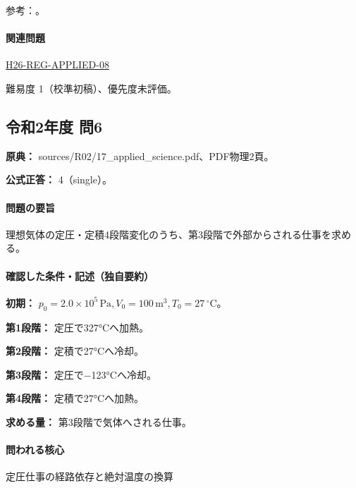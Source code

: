 \par 参考：\cite{mit_thermo_firstlaw2008}。

\paragraph{関連問題} \hyperref[q:h26-reg-applied-08]{H26-REG-APPLIED-08}

\par 難易度 1（校準初稿）、優先度未評価。

\subsection{令和2年度 問6}
\label{q:r02-reg-applied-06}

\noindent\textbf{原典：} sources/R02/17\_applied\_science.pdf、PDF物理2頁。

\textbf{公式正答：} 4（single）。

\paragraph{問題の要旨} 理想気体の定圧・定積4段階変化のうち、第3段階で外部からされる仕事を求める。

\paragraph{確認した条件・記述（独自要約）}\mbox{}\par

\noindent\textbf{初期：} \(p_0=2.0\times10^5\,\mathrm{Pa},V_0=100\,\mathrm{m}^3,T_0=27\,{}^\circ\mathrm{C}\)。\par

\noindent\textbf{第1段階：} 定圧で327°Cへ加熱。\par

\noindent\textbf{第2段階：} 定積で27°Cへ冷却。\par

\noindent\textbf{第3段階：} 定圧で−123°Cへ冷却。\par

\noindent\textbf{第4段階：} 定積で27°Cへ加熱。\par

\noindent\textbf{求める量：} 第3段階で気体へされる仕事。\par

\paragraph{問われる核心} 定圧仕事の経路依存と絶対温度の換算

